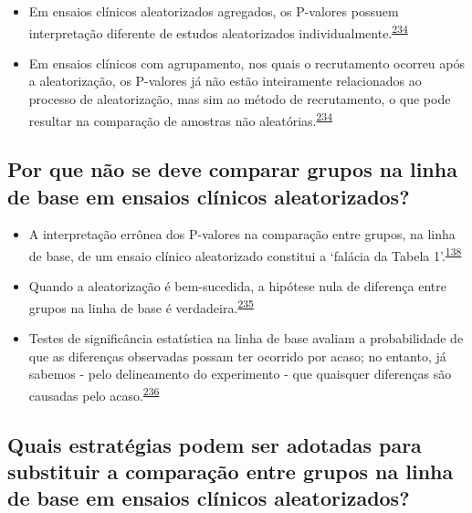 \documentclass[
  a4paper,
]{book}
\begin{document}
\begin{itemize}
\item
  Em ensaios clínicos aleatorizados agregados, os P-valores possuem interpretação diferente de estudos aleatorizados individualmente.\textsuperscript{\protect\hyperlink{ref-Bolzern2019}{234}}
\item
  Em ensaios clínicos com agrupamento, nos quais o recrutamento ocorreu após a aleatorização, os P-valores já não estão inteiramente relacionados ao processo de aleatorização, mas sim ao método de recrutamento, o que pode resultar na comparação de amostras não aleatórias.\textsuperscript{\protect\hyperlink{ref-Bolzern2019}{234}}
\end{itemize}

\hypertarget{por-que-nuxe3o-se-deve-comparar-grupos-na-linha-de-base-em-ensaios-cluxednicos-aleatorizados}{%
\subsection{Por que não se deve comparar grupos na linha de base em ensaios clínicos aleatorizados?}\label{por-que-nuxe3o-se-deve-comparar-grupos-na-linha-de-base-em-ensaios-cluxednicos-aleatorizados}}

\begin{itemize}
\item
  A interpretação errônea dos P-valores na comparação entre grupos, na linha de base, de um ensaio clínico aleatorizado constitui a `falácia da Tabela 1'.\textsuperscript{\protect\hyperlink{ref-pijls2022}{138}}
\item
  Quando a aleatorização é bem-sucedida, a hipótese nula de diferença entre grupos na linha de base é verdadeira.\textsuperscript{\protect\hyperlink{ref-roberts1999}{235}}
\item
  Testes de significância estatística na linha de base avaliam a probabilidade de que as diferenças observadas possam ter ocorrido por acaso; no entanto, já sabemos - pelo delineamento do experimento - que quaisquer diferenças são causadas pelo acaso.\textsuperscript{\protect\hyperlink{ref-gruijters2020}{236}}
\end{itemize}

\hypertarget{quais-estratuxe9gias-podem-ser-adotadas-para-substituir-a-comparauxe7uxe3o-entre-grupos-na-linha-de-base-em-ensaios-cluxednicos-aleatorizados}{%
\subsection{Quais estratégias podem ser adotadas para substituir a comparação entre grupos na linha de base em ensaios clínicos aleatorizados?}\label{quais-estratuxe9gias-podem-ser-adotadas-para-substituir-a-comparauxe7uxe3o-entre-grupos-na-linha-de-base-em-ensaios-cluxednicos-aleatorizados}}
\end{document}
